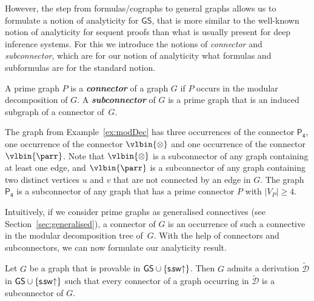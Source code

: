 \documentclass{lmcs} %
\def\GS{\mathsf{GS}}
\def\defn#1{\emph{\bfseries\boldmath #1}}
\def\ssur{\ussrule}
\def\set#1{\{#1\}}
\def\lpar{\vlbin{\parr}}
\def\ltens{\vlbin{\otimes}}
\def\ssrule{\mathsf{s\mkern-1mu.\mkern-1mu sw}}
\def\ussrule{\ssrule\mathord{\uparrow}}
\def\gG{G}
\def\gP{P}
\newcommand{\vertices}[1][]{V_{#1}}
\newcommand{\vP}{\vertices[P]}
\newcommand{\tdD}{\tilde{\mathcal{D}}}
\newcommand{\sizeof}[1]{|#1|}
\theoremstyle{plain}
\def\pfour{\mathsf{P_4}}
\begin{document}
However, the step from formulas/cographs to general graphs allows us
to formulate a notion of analyticity for $\GS$, that is more similar
to the well-known notion of analyticity for sequent proofs than what
is usually present for deep inference systems.  For this we introduce
the notions of \emph{connector} and \emph{subconnector}, which are for our
notion of analyticity what formulas and subformulas are for the
standard notion.




\begin{defi}
A prime graph $\gP$ is a \defn{connector} of a graph $\gG$ 
if $\gP$ occurs in the modular decomposition of $\gG$.
A \defn{subconnector} of $\gG$ is a prime graph that is an induced subgraph of a connector of~$\gG$.
\end{defi}

\begin{exa}
  The graph from Example~\ref{ex:modDec} has three occurrences of the connector $\pfour$,
  one occurrence of the connector $\ltens$ and one occurrence of the connector $\lpar$.  Note that $\ltens$ is a
  subconnector of any graph containing at least one edge, and $\lpar$ is a
  subconnector of any graph containing two distinct vertices $u$ and $v$
  that are not connected by an edge in $\gG$. The graph $\pfour$ is a
  subconnector of any graph that has a prime connector $\gP$ with
  $\sizeof\vP\geq 4$.
\end{exa}
%
Intuitively, if we consider prime graphs as generalised connectives (see Section~\ref{sec:generalised}), a connector of $\gG$ is an occurrence of such a connective in the modular decomposition tree of~$\gG$.
With the help of connectors and subconnectors, we can now formulate our analyticity result.

\def\GSplus{\GS\cup\set{\ssur}}

\begin{thm}[Analyticity]\label{thm:anaCon}
  Let $\gG$ be a graph that is provable in $\GSplus$.
  Then $\gG$ admits a derivation $\tdD$ in $\GSplus$ 
  such that every connector of a graph occurring in $\tdD$ is a subconnector of $\gG$.
\end{thm}
\end{document}
